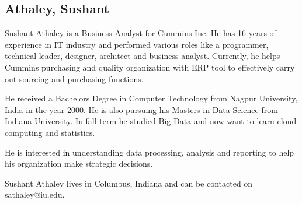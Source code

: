 \subsection{Athaley, Sushant}
Sushant Athaley is a Business Analyst for Cummins Inc. He has 16 years of experience in IT industry and performed various roles like a programmer, technical leader, designer, architect and business analyst. Currently, he helps Cummins purchasing and quality organization with ERP tool to effectively carry out sourcing and purchasing functions.

He received a Bachelors Degree in Computer Technology from Nagpur University, India in the year 2000. He is also pursuing his Masters in Data Science from Indiana University. In fall term he studied Big Data and now want to learn cloud computing and statistics.

He is interested in understanding data processing, analysis and reporting to help his organization make strategic decisions.

Sushant Athaley lives in Columbus, Indiana and can be contacted on sathaley@iu.edu.
